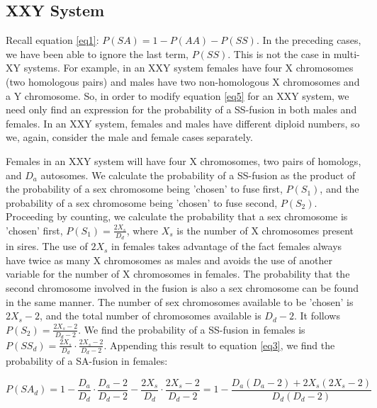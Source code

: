 \documentclass[12pt]{article}
\begin{document}
\subsection{XXY System}
Recall equation \ref{eq1}: $P(SA) = 1-P(AA)-P(SS)$. In the preceding cases, we have been able to ignore the last term, $P(SS)$.
This is not the case in multi-XY systems.
For example, in an XXY system females have four X chromosomes (two homologous pairs) and males have two non-homologous X chromosomes and a Y chromosome.
So, in order to modify equation \ref{eq5} for an XXY system, we need only find an expression for the probability of a SS-fusion in both males and females. 
In an XXY system, females and males have different diploid numbers, so we, again, consider the male and female cases separately. 

Females in an XXY system will have four X chromosomes, two pairs of homologs, and $D_a$ autosomes. 
We calculate the probability of a SS-fusion as the product of the probability of a sex chromosome being 'chosen' to fuse first, $P(S_1)$, and the probability of a sex chromosome being 'chosen' to fuse second, $P(S_2)$. 
Proceeding by counting, we calculate the probability that a sex chromosome is 'chosen' first,
$P(S_1) = \frac{2X_s}{D_d} $, where $X_s$ is the number of X chromosomes present in sires. 
The use of $2X_s$ in females takes advantage of the fact females always have twice as many X chromosomes as males and avoids the use of another variable for the number of X chromosomes in females.
The probability that the second chromosome involved in the fusion is also a sex chromosome can be found in the same manner. 
The number of sex chromosomes available to be 'chosen' is $2X_s - 2 $, and the total number of chromosomes available is $D_d - 2$. 
It follows $P(S_2) = \frac{2X_s-2}{D_d-2}$. 
We find the probability of a SS-fusion in females is  $P(SS_d) = \frac{2X_s}{D_d} \cdot \frac{2X_s-2}{D_d-2}$.
Appending this result to equation \ref{eq3}, we find the probability of a SA-fusion in females:

    \begin{equation} \label{eq6}
        P(SA_d) = 1 - \frac{D_a}{D_d} \cdot \frac{D_a - 2}{D_d - 2} -  \frac{2X_s}{D_d} \cdot \frac{2X_s-2}{D_d-2} = 1 - \frac{D_a(D_a-2) + 2X_s(2X_s-2)}{D_d(D_d-2)}
    \end{equation}
\end{document}
